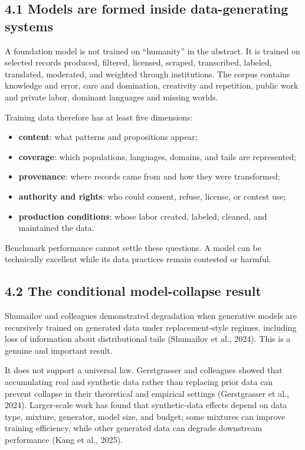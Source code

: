 \documentclass[
  11pt,
]{article}
\providecommand{\tightlist}{%
  \setlength{\itemsep}{0pt}\setlength{\parskip}{0pt}}
\begin{document}
\subsection{4.1 Models are formed inside data-generating
systems}\label{models-are-formed-inside-data-generating-systems}

A foundation model is not trained on ``humanity'' in the abstract. It is
trained on selected records produced, filtered, licensed, scraped,
transcribed, labeled, translated, moderated, and weighted through
institutions. The corpus contains knowledge and error, care and
domination, creativity and repetition, public work and private labor,
dominant languages and missing worlds.

Training data therefore has at least five dimensions:

\begin{itemize}
\tightlist
\item
  \textbf{content}: what patterns and propositions appear;
\item
  \textbf{coverage}: which populations, languages, domains, and tails
  are represented;
\item
  \textbf{provenance}: where records came from and how they were
  transformed;
\item
  \textbf{authority and rights}: who could consent, refuse, license, or
  contest use;
\item
  \textbf{production conditions}: whose labor created, labeled, cleaned,
  and maintained the data.
\end{itemize}

Benchmark performance cannot settle these questions. A model can be
technically excellent while its data practices remain contested or
harmful.

\subsection{4.2 The conditional model-collapse
result}\label{the-conditional-model-collapse-result}

Shumailov and colleagues demonstrated degradation when generative models
are recursively trained on generated data under replacement-style
regimes, including loss of information about distributional tails
(Shumailov et al., 2024). This is a genuine and important result.

It does not support a universal law. Gerstgrasser and colleagues showed
that accumulating real and synthetic data rather than replacing prior
data can prevent collapse in their theoretical and empirical settings
(Gerstgrasser et al., 2024). Larger-scale work has found that
synthetic-data effects depend on data type, mixture, generator, model
size, and budget; some mixtures can improve training efficiency, while
other generated data can degrade downstream performance (Kang et al.,
2025).
\end{document}
